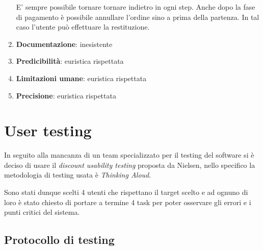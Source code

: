 \documentclass[12pt,italian,]{report}
\begin{document}
\begin{enumerate}
  E' sempre possibile tornare tornare indietro in ogni step. Anche dopo la fase di pagamento è possibile annullare l'ordine sino a prima della partenza. In tal caso l'utente può effettuare la restituzione.
\item
  \textbf{Documentazione}: inesistente
\item
  \textbf{Predicibilità}: euristica rispettata
\item
  \textbf{Limitazioni umane}: euristica rispettata
\item
  \textbf{Precisione}: euristica rispettata
\end{enumerate}

\section{User testing}\label{user-testing}

In seguito alla mancanza di un team specializzato per il testing del
software si è deciso di usare il \emph{discount usability testing}
proposta da Nielsen, nello specifico la metodologia di testing usata è
\emph{Thinking Aloud}.

Sono stati dunque scelti 4 utenti che rispettano il target scelto e ad
ognuno di loro è stato chiesto di portare a termine 4 task per poter
osservare gli errori e i punti critici del sistema.

\subsection{Protocollo di testing}\label{protocollo-di-testing}
\end{document}
